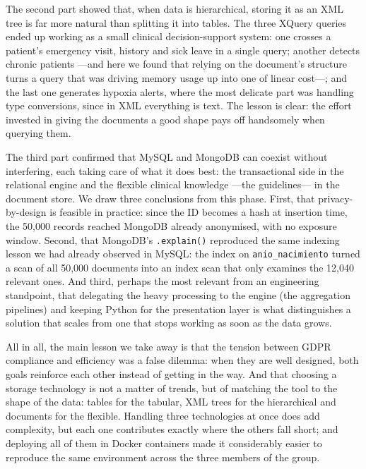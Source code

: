 \documentclass[../main.tex]{subfiles}
\begin{document}
The second part showed that, when data is hierarchical, storing it as an XML tree is far more natural than splitting it into tables. The three XQuery queries ended up working as a small clinical decision-support system: one crosses a patient's emergency visit, history and sick leave in a single query; another detects chronic patients ---and here we found that relying on the document's structure turns a query that was driving memory usage up into one of linear cost---; and the last one generates hypoxia alerts, where the most delicate part was handling type conversions, since in XML everything is text. The lesson is clear: the effort invested in giving the documents a good shape pays off handsomely when querying them.

The third part confirmed that MySQL and MongoDB can coexist without interfering, each taking care of what it does best: the transactional side in the relational engine and the flexible clinical knowledge ---the guidelines--- in the document store. We draw three conclusions from this phase. First, that privacy-by-design is feasible in practice: since the ID becomes a hash at insertion time, the 50,000 records reached MongoDB already anonymised, with no exposure window. Second, that MongoDB's \texttt{.explain()} reproduced the same indexing lesson we had already observed in MySQL: the index on \texttt{anio\_nacimiento} turned a scan of all 50,000 documents into an index scan that only examines the 12,040 relevant ones. And third, perhaps the most relevant from an engineering standpoint, that delegating the heavy processing to the engine (the aggregation pipelines) and keeping Python for the presentation layer is what distinguishes a solution that scales from one that stops working as soon as the data grows.

All in all, the main lesson we take away is that the tension between GDPR compliance and efficiency was a false dilemma: when they are well designed, both goals reinforce each other instead of getting in the way. And that choosing a storage technology is not a matter of trends, but of matching the tool to the shape of the data: tables for the tabular, XML trees for the hierarchical and documents for the flexible. Handling three technologies at once does add complexity, but each one contributes exactly where the others fall short; and deploying all of them in Docker containers made it considerably easier to reproduce the same environment across the three members of the group.

\end{document}
